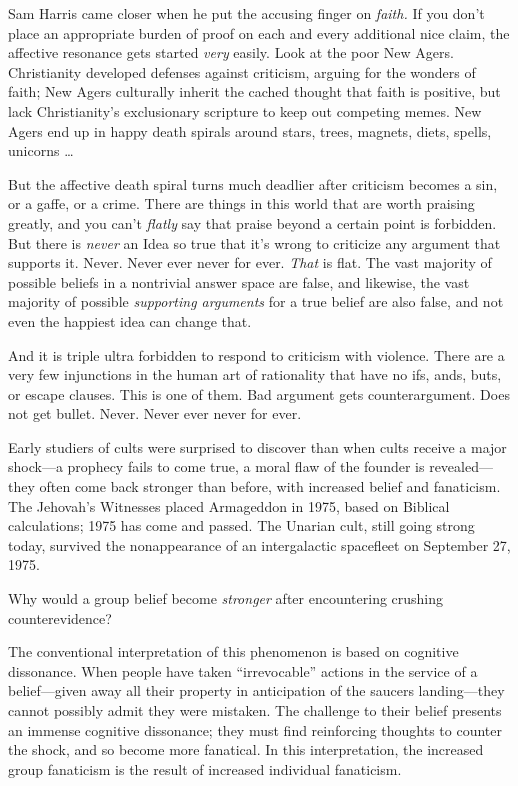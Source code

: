 {
 Sam Harris came closer when he put the accusing finger on
\textit{faith.} If you don't place an appropriate
burden of proof on each and every additional nice claim, the affective
resonance gets started \textit{very} easily. Look at the poor New
Agers. Christianity developed defenses against criticism, arguing for
the wonders of faith; New Agers culturally inherit the cached thought
that faith is positive, but lack Christianity's
exclusionary scripture to keep out competing memes. New Agers end up in
happy death spirals around stars, trees, magnets, diets, spells,
unicorns \ldots}

{
 But the affective death spiral turns much deadlier after criticism
becomes a sin, or a gaffe, or a crime. There are things in this world
that are worth praising greatly, and you can't
\textit{flatly} say that praise beyond a certain point is forbidden.
But there is \textit{never} an Idea so true that it's
wrong to criticize any argument that supports it. Never. Never ever
never for ever. \textit{That} is flat. The vast majority of possible
beliefs in a nontrivial answer space are false, and likewise, the vast
majority of possible \textit{supporting arguments} for a true belief
are also false, and not even the happiest idea can change that.}

{
 And it is triple ultra forbidden to respond to criticism with
violence. There are a very few injunctions in the human art of
rationality that have no ifs, ands, buts, or escape clauses. This is
one of them. Bad argument gets counterargument. Does not get bullet.
Never. Never ever never for ever.}

\myendsectiontext


{
 Early studiers of cults were surprised to discover than when cults
receive a major shock---a prophecy fails to come true, a moral flaw of
the founder is revealed---they often come back stronger than before,
with increased belief and fanaticism. The Jehovah's
Witnesses placed Armageddon in 1975, based on Biblical calculations;
1975 has come and passed. The Unarian cult, still going strong today,
survived the nonappearance of an intergalactic spacefleet on September
27, 1975. }

{
 Why would a group belief become \textit{stronger} after
encountering crushing counterevidence?}

{
 The conventional interpretation of this phenomenon is based on
cognitive dissonance. When people have taken
``irrevocable'' actions in the
service of a belief---given away all their property in anticipation of
the saucers landing---they cannot possibly admit they were mistaken.
The challenge to their belief presents an immense cognitive dissonance;
they must find reinforcing thoughts to counter the shock, and so become
more fanatical. In this interpretation, the increased group fanaticism
is the result of increased individual fanaticism.}

